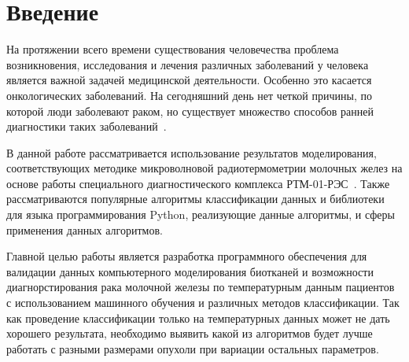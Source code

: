 \newpage
\section{Введение}
На протяжении всего времени существования человечества проблема возникновения, исследования и лечения различных заболеваний у человека является важной задачей медицинской деятельности. Особенно это касается онкологических заболеваний. На сегодняшний день нет четкой причины, по которой люди заболевают раком, но существует множество способов ранней диагностики таких заболеваний~\cite{fear2000}.
\par В данной работе рассматривается использование результатов моделирования, соответствующих методике микроволновой радиотермометрии молочных желез на основе работы специального диагностического комплекса РТМ-01-РЭС~\cite{problemiIzmereniyaVolsu}. Также рассматриваются популярные алгоритмы классификации данных и библиотеки для языка программирования Python, реализующие данные алгоритмы, и сферы применения данных алгоритмов.
\par Главной целью работы является разработка программного обеспечения для валидации данных компьютерного моделирования биотканей и возможности диагнорстирования рака молочной железы по температурным данным пациентов с использованием машинного обучения и различных методов классификации. Так как проведение классификации только на температурных данных может не дать хорошего результата, необходимо выявить какой из алгоритмов будет лучше работать с разными размерами опухоли при вариации остальных параметров.
